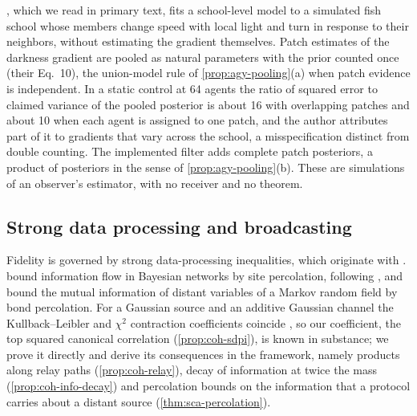 \citet{heins2026collective}, which we read in primary text, fits a school-level model to a simulated fish school whose members change speed with local light and turn in response to their neighbors, without estimating the gradient themselves. Patch estimates of the darkness gradient are pooled as natural parameters with the prior counted once (their Eq.~10), the union-model rule of \cref{prop:agy-pooling}(a) when patch evidence is independent. In a static control at 64 agents the ratio of squared error to claimed variance of the pooled posterior is about 16 with overlapping patches and about 10 when each agent is assigned to one patch, and the author attributes part of it to gradients that vary across the school, a misspecification distinct from double counting. The implemented filter adds complete patch posteriors, a product of posteriors in the sense of \cref{prop:agy-pooling}(b). These are simulations of an observer's estimator, with no receiver and no theorem.

\subsection{Strong data processing and broadcasting}\label{sec:rel-sdpi}

Fidelity is governed by strong data-processing inequalities, which originate with \citet{ahlswede1976spreading}. \citet{polyanskiy2017strong} bound information flow in Bayesian networks by site percolation, following \citet{evans1999signal}, and \citet{polyanskiy2019application} bound the mutual information of distant variables of a Markov random field by bond percolation. For a Gaussian source and an additive Gaussian channel the Kullback--Leibler and $\chi^2$ contraction coefficients coincide \citep{makur2020comparison}, so our coefficient, the top squared canonical correlation (\cref{prop:coh-sdpi}), is known in substance; we prove it directly and derive its consequences in the framework, namely products along relay paths (\cref{prop:coh-relay}), decay of information at twice the mass (\cref{prop:coh-info-decay}) and percolation bounds on the information that a protocol carries about a distant source (\cref{thm:sca-percolation}).

